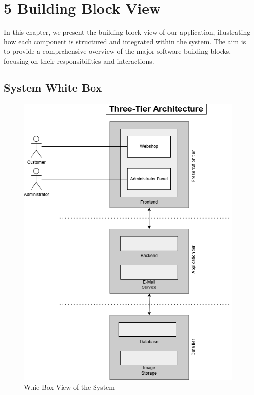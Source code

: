 \hypertarget{section-building-block-view}{%
\section{5 Building Block View}\label{section-building-block-view}}
In this chapter, we present the building block view of our application, illustrating how each component is structured and integrated within the system. The aim is to provide a comprehensive overview of the major software building blocks, focusing on their responsibilities and interactions.
\subsection{System White Box}
\begin{figure}[!h!]
    \centering
    \includegraphics[width=\textwidth]{images/building_block_system_whitebox.png}
    \caption{Whie Box View of the System}
\end{figure}

